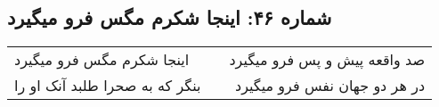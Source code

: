 \begin{center}
\section*{شماره ۴۶: اینجا شکرم مگس فرو میگیرد}
\label{sec:046}
\begin{longtable}{l p{0.5cm} r}
اینجا شکرم مگس فرو میگیرد
&&
صد واقعه پیش و پس فرو میگیرد
\\
بنگر که به صحرا طلبد آنک او را
&&
در هر دو جهان نفس فرو میگیرد
\\
\end{longtable}
\end{center}

